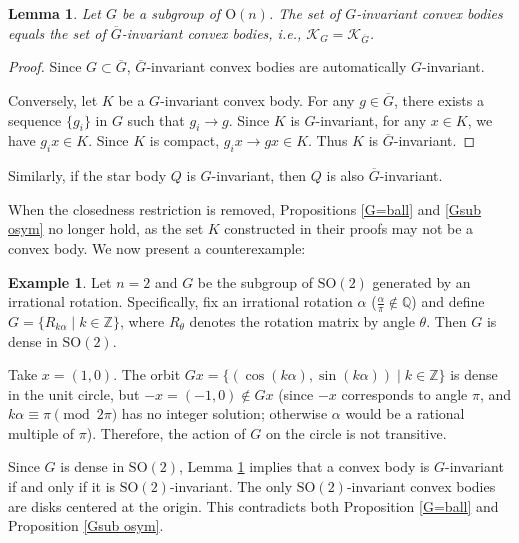\documentclass[12pt, reqno]{amsart}
\newtheorem{lemma}[theorem]{Lemma}
\theoremstyle{definition}
\newtheorem{example}[theorem]{Example}
\theoremstyle{remark}
\numberwithin{equation}{section}
\newcommand{\On}{\mathrm{O}(n)}
\begin{document}
	
	\begin{lemma}\label{ap2}
			Let $ G $ be a  subgroup of   $ \On $. The set of $G$-invariant convex bodies equals 
			the set of $\overline{G}$-invariant convex bodies, i.e., $\mathcal{K}_{G}=\mathcal{K}_{\overline{G}}$.
	\end{lemma}

\begin{proof}
	Since $G\subset \overline{G}$, $\overline{G}$-invariant convex bodies are automatically  $G$-invariant. 
	
	
	Conversely, let $K$ be a $G$-invariant convex body. For any $g\in\overline{G}$,  there exists a sequence $\{g_{i}\}$ in $G$ such that $g_{i}\rightarrow g$. Since $K$ is $G$-invariant, for any $x\in K$, we have $g_{i}x\in K$. Since $K$ is compact, $g_i x \to gx\in K$. Thus $K$ is  $\overline{G}$-invariant.
\end{proof}

Similarly, if the star body $Q$ is $G$-invariant, then $Q$ is also $\overline{G}$-invariant.


	When the closedness restriction is removed, Propositions \ref{G=ball} and \ref{Gsub osym} no longer hold, as the set $K$ constructed in their proofs may not  be a convex body.  We now present a counterexample:
	
\begin{example}
		 Let $n = 2$ and $G$ be the subgroup of $\mathrm{SO}(2)$ generated by an irrational rotation. Specifically, fix an irrational rotation $\alpha$ ($\frac{\alpha}{\pi}\notin \mathbb{Q}$) and define $G = \{ R_{k\alpha} \mid k \in \mathbb{Z} \}$, where $R_\theta$ denotes the rotation matrix by angle $\theta$. Then $G$ is dense in $\mathrm{SO}(2)$.
		
		 Take $x = (1,0)$. The orbit $Gx = \{ (\cos(k\alpha), \sin(k\alpha)) \mid k \in \mathbb{Z} \}$ is dense in the unit circle, but $-x = (-1,0) \notin Gx$ (since $-x$ corresponds to angle $\pi$, and $k\alpha \equiv \pi \pmod{2\pi}$ has no integer solution; otherwise $\alpha$ would be a rational multiple of $\pi$).  Therefore, the action of $G$ on the circle is not transitive.
		
	  Since $G$ is dense in $\mathrm{SO}(2)$,  Lemma \ref{ap2} implies that a convex body is $G$-invariant if and only if it is $\mathrm{SO}(2)$-invariant.  The only $\mathrm{SO}(2)$-invariant convex bodies are  disks centered at the origin. This contradicts both Proposition \ref{G=ball} and Proposition \ref{Gsub osym}.
	\end{example}
	
\end{document}
